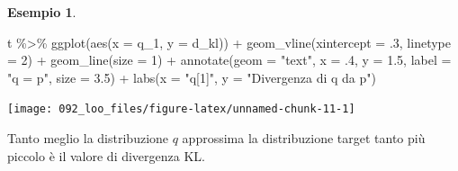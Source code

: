 \documentclass[
  10pt,
  italian,
  a4paper,
  extrafontsizes,onecolumn,openright
  ]{memoir}
\newenvironment{Shaded}{\begin{snugshade}}{\end{snugshade}}
\newcommand{\AttributeTok}[1]{\textcolor[rgb]{0.77,0.63,0.00}{#1}}
\newcommand{\DecValTok}[1]{\textcolor[rgb]{0.00,0.00,0.81}{#1}}
\newcommand{\FloatTok}[1]{\textcolor[rgb]{0.00,0.00,0.81}{#1}}
\newcommand{\FunctionTok}[1]{\textcolor[rgb]{0.00,0.00,0.00}{#1}}
\newcommand{\NormalTok}[1]{#1}
\newcommand{\SpecialCharTok}[1]{\textcolor[rgb]{0.00,0.00,0.00}{#1}}
\newcommand{\StringTok}[1]{\textcolor[rgb]{0.31,0.60,0.02}{#1}}
\theoremstyle{definition}
\theoremstyle{definition}
\newtheorem{example}{Esempio}[chapter]
\theoremstyle{definition}
\theoremstyle{definition}
\theoremstyle{remark}
\begin{document}
\begin{example}
\begin{Shaded}
\begin{Highlighting}[]
\NormalTok{t }\SpecialCharTok{\%\textgreater{}\%}
  \FunctionTok{ggplot}\NormalTok{(}\FunctionTok{aes}\NormalTok{(}\AttributeTok{x =}\NormalTok{ q\_1, }\AttributeTok{y =}\NormalTok{ d\_kl)) }\SpecialCharTok{+}
  \FunctionTok{geom\_vline}\NormalTok{(}\AttributeTok{xintercept =}\NormalTok{ .}\DecValTok{3}\NormalTok{, }\AttributeTok{linetype =} \DecValTok{2}\NormalTok{) }\SpecialCharTok{+}
  \FunctionTok{geom\_line}\NormalTok{(}\AttributeTok{size =} \DecValTok{1}\NormalTok{) }\SpecialCharTok{+}
  \FunctionTok{annotate}\NormalTok{(}\AttributeTok{geom =} \StringTok{"text"}\NormalTok{, }\AttributeTok{x =}\NormalTok{ .}\DecValTok{4}\NormalTok{, }\AttributeTok{y =} \FloatTok{1.5}\NormalTok{, }\AttributeTok{label =} \StringTok{"q = p"}\NormalTok{,}
           \AttributeTok{size =} \FloatTok{3.5}\NormalTok{) }\SpecialCharTok{+}
  \FunctionTok{labs}\NormalTok{(}\AttributeTok{x =} \StringTok{"q[1]"}\NormalTok{,}
       \AttributeTok{y =} \StringTok{"Divergenza di q da p"}\NormalTok{)}
\end{Highlighting}
\end{Shaded}

\begin{center}\texttt{[image: 092\_loo\_files/figure-latex/unnamed-chunk-11-1]} \end{center}

\noindent
Tanto meglio la distribuzione \(q\) approssima la distribuzione target tanto più piccolo è il valore di divergenza KL.
\end{example}
\end{document}
